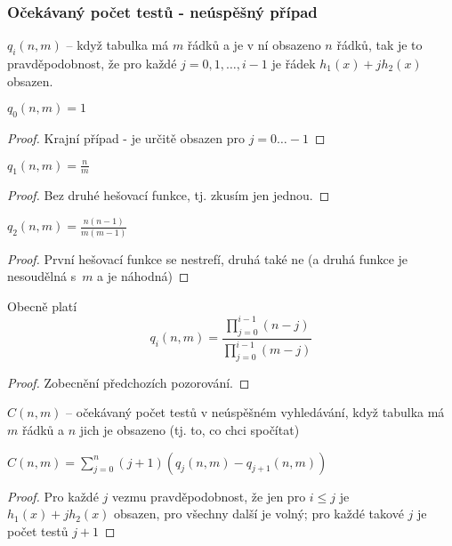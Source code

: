 \documentclass[a4paper,12pt]{article}
\begin{document}
\subsubsection{Očekávaný počet testů - neúspěšný případ}


\begin{definice} $q_i(n,m)$ -- když tabulka má $m$ řádků a 
je v ní obsazeno $n$ řádků, tak je to 
pravděpodobnost, že pro každé $j=0,1,\dots,i-1$ je 
řádek $h_1(x)+jh_2(x)$ obsazen.
\end{definice} 

\begin{pozorovani} $q_0(n,m)=1$
\end{pozorovani}
\begin{proof}
    Krajní případ - je určitě obsazen pro $j=0 \dots -1$
\end{proof}

\begin{pozorovani} $q_1(n,m)=\frac nm$
\end{pozorovani}
\begin{proof}
    Bez druhé hešovací funkce, tj. zkusím jen jednou.
\end{proof}

\begin{pozorovani} $q_2(n,m)=\frac {n(n-1)}{m(m-1)}$
\end{pozorovani}
\begin{proof}
    První hešovací funkce se nestrefí, druhá také ne (a druhá funkce je nesoudělná s~$m$ a je náhodná)
\end{proof}

\begin{lemma} 
    Obecně platí $$q_i(n,m)=\frac {\prod_{j=0}^{i-1}(n-j)}{\prod_{j=0}^{i-1}(m-j)}$$
\end{lemma}
\begin{proof}
Zobecnění předchozích pozorování.
\end{proof}

\begin{definice}
$C(n,m)$ -- očekávaný počet testů v neúspěšném 
vyhledávání, když tabulka má $m$ řádků a $
n$ jich 
je obsazeno (tj. to, co chci spočítat)
\end{definice}

\begin{lemma}
    $C(n,m)=\sum_{j=0}^n(j+1)(q_j(n,m)-q_{j+1}(n,m))$
\end{lemma}
\begin{proof}
    Pro každé $j$ vezmu pravděpodobnost, že jen pro $i\le j$ je $h_1(x)+jh_2(x)$ obsazen, pro všechny další je volný; pro každé takové $j$ je počet testů $j+1$ 
\end{proof}
\end{document}
